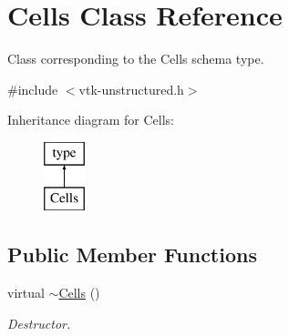 \hypertarget{classCells}{\section{Cells Class Reference}
\label{classCells}
}


Class corresponding to the Cells schema type.  




{\ttfamily \#include $<$vtk-\/unstructured.\+h$>$}

Inheritance diagram for Cells\+:\begin{figure}[H]
\begin{center}
\leavevmode
\includegraphics[height=2.000000cm]{classCells}
\end{center}
\end{figure}
\subsection*{Public Member Functions}
\begin{DoxyCompactItemize}
\item 
virtual \hyperlink{classCells_aab121634db81b439226a33fd099fb3c1}{$\sim$\+Cells} ()
\begin{DoxyCompactList}\small\item\em Destructor. \end{DoxyCompactList}\end{DoxyCompactItemize}
